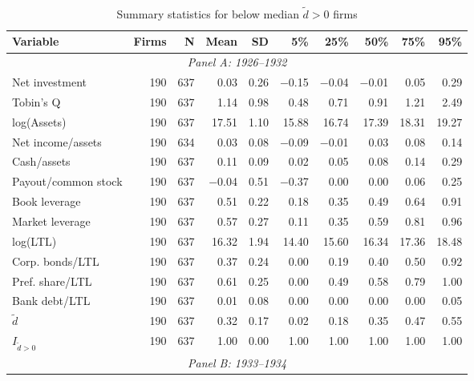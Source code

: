 \begin{table}[p]\centering
    \caption{\\ Summary statistics for below median $\tilde{d} > 0$ firms}\scriptsize
    \label{tabapp:summary_I_smalld}
    \begin{threeparttable}
        \begin{tabular}{lrrrrrrrrr}
            \toprule
            Variable & Firms & N & Mean & SD & 5\% & 25\% & 50\% & 75\% & 95\% \\
            \midrule
            \multicolumn{10}{c}{\textit{Panel A: 1926--1932}} \\
            \midrule
            Net investment & 190 & 637 & 0.03 & 0.26 & $-$0.15 & $-$0.04 & $-$0.01 & 0.05 & 0.29 \\
            Tobin's Q & 190 & 637 & 1.14 & 0.98 & 0.48 & 0.71 & 0.91 & 1.21 & 2.49 \\
            log(Assets) & 190 & 637 & 17.51 & 1.10 & 15.88 & 16.74 & 17.39 & 18.31 & 19.27 \\
            Net income/assets & 190 & 634 & 0.03 & 0.08 & $-$0.09 & $-$0.01 & 0.03 & 0.08 & 0.14 \\
            Cash/assets & 190 & 637 & 0.11 & 0.09 & 0.02 & 0.05 & 0.08 & 0.14 & 0.29 \\
            Payout/common stock & 190 & 637 & $-$0.04 & 0.51 & $-$0.37 & 0.00 & 0.00 & 0.06 & 0.25 \\
            Book leverage & 190 & 637 & 0.51 & 0.22 & 0.18 & 0.35 & 0.49 & 0.64 & 0.91 \\
            Market leverage & 190 & 637 & 0.57 & 0.27 & 0.11 & 0.35 & 0.59 & 0.81 & 0.96 \\
            log(LTL) & 190 & 637 & 16.32 & 1.94 & 14.40 & 15.60 & 16.34 & 17.36 & 18.48 \\
            Corp. bonds/LTL & 190 & 637 & 0.37 & 0.24 & 0.00 & 0.19 & 0.40 & 0.50 & 0.92 \\
            Pref. share/LTL & 190 & 637 & 0.61 & 0.25 & 0.00 & 0.49 & 0.58 & 0.79 & 1.00 \\
            Bank debt/LTL & 190 & 637 & 0.01 & 0.08 & 0.00 & 0.00 & 0.00 & 0.00 & 0.05 \\
            \ensuremath{\tilde{d}} & 190 & 637 & 0.32 & 0.17 & 0.02 & 0.18 & 0.35 & 0.47 & 0.55 \\
            \ensuremath{I_{\tilde{d}>0}} & 190 & 637 & 1.00 & 0.00 & 1.00 & 1.00 & 1.00 & 1.00 & 1.00 \\
            \midrule
            \multicolumn{10}{c}{\textit{Panel B: 1933--1934}} \\

\end{tabular}
\end{threeparttable}
\end{table}
